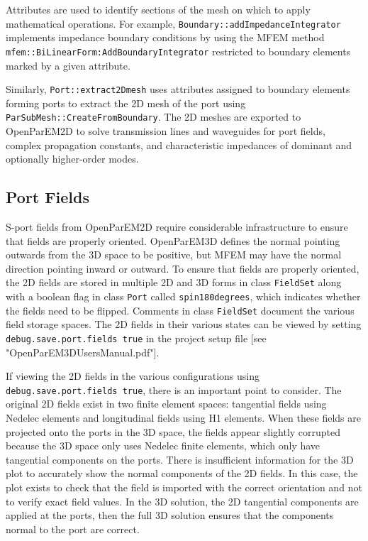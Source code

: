 \documentclass[titlepage]{article}
\renewcommand\_{\textunderscore\linebreak[1]}
\begin{document}
Attributes are used to identify sections of the mesh on which to apply mathematical operations.  For example, \texttt{Boundary::addImpedanceIntegrator} implements impedance boundary conditions by using the MFEM method \texttt{mfem::BiLinearForm:AddBoundaryIntegrator} restricted to boundary elements marked by a given attribute.

Similarly, \texttt{Port::extract2Dmesh} uses attributes assigned to boundary elements forming ports to extract the 2D mesh of the port using \texttt{ParSubMesh::CreateFromBoundary}.  The 2D meshes are exported to OpenParEM2D to solve transmission lines and waveguides for port fields, complex propagation constants, and characteristic impedances of dominant and optionally higher-order modes.

\subsection{Port Fields}

S-port fields from OpenParEM2D require considerable infrastructure to ensure that fields are properly oriented.  OpenParEM3D defines the normal pointing outwards from the 3D space to be positive, but MFEM may have the normal direction pointing inward or outward.  To ensure that fields are properly oriented, the 2D fields are stored in multiple 2D and 3D forms in class \texttt{FieldSet} along with a boolean flag in class \texttt{Port} called \texttt{spin180degrees}, which indicates whether the fields need to be flipped.  Comments in class \texttt{FieldSet} document the various field storage spaces.  The 2D fields in their various states can be viewed by setting \texttt{debug.save.port.fields true} in the project setup file [see "OpenParEM3D\_Users\_Manual.pdf"].

If viewing the 2D fields in the various configurations using \texttt{debug.save.port.fields true}, there is an important point to consider.  The original 2D fields exist in two finite element spaces: tangential fields using Nedelec elements and longitudinal fields using H1 elements.  When these fields are projected onto the ports in the 3D space, the fields appear slightly corrupted because the 3D space only uses Nedelec finite elements, which only have tangential components on the ports.  There is insufficient information for the 3D plot to accurately show the normal components of the 2D fields.  In this case, the plot exists to check that the field is imported with the correct orientation and not to verify exact field values.  In the 3D solution, the 2D tangential components are applied at the ports, then the full 3D solution ensures that the components normal to the port are correct.
\end{document}
